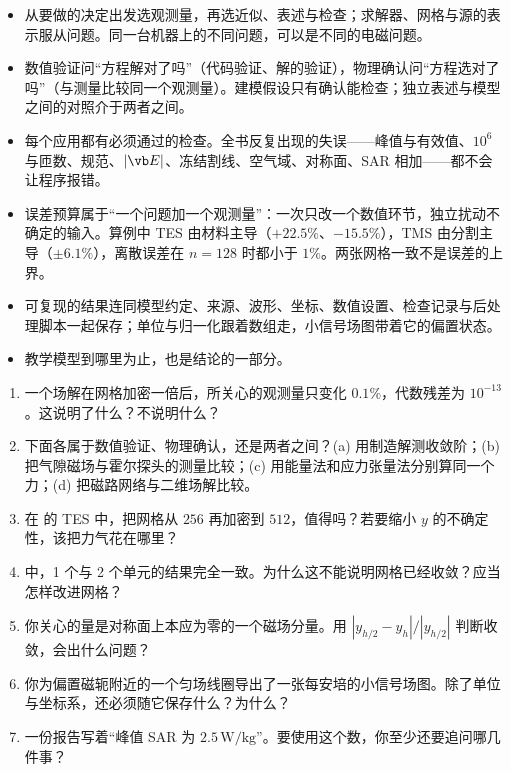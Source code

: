 \begin{takeaways}
\begin{itemize}
\item 从要做的决定出发选观测量，再选近似、表述与检查；求解器、网格与源的表示服从问题。同一台机器上的不同问题，可以是不同的电磁问题。
\item 数值验证问“方程解对了吗”（代码验证、解的验证），物理确认问“方程选对了吗”（与测量比较同一个观测量）。建模假设只有确认能检查；独立表述与模型之间的对照介于两者之间。
\item 每个应用都有必须通过的检查。全书反复出现的失误——峰值与有效值、$10^6$ 与匝数、规范、$|\vb E|$、冻结割线、空气域、对称面、SAR 相加——都不会让程序报错。
\item 误差预算属于“一个问题加一个观测量”：一次只改一个数值环节，独立扰动不确定的输入。算例中 TES 由材料主导（$+22.5\%$、$-15.5\%$），TMS 由分割主导（$\pm6.1\%$），离散误差在 $n=128$ 时都小于 $1\%$。两张网格一致不是误差的上界。
\item 可复现的结果连同模型约定、来源、波形、坐标、数值设置、检查记录与后处理脚本一起保存；单位与归一化跟着数组走，小信号场图带着它的偏置状态。
\item 教学模型到哪里为止，也是结论的一部分。
\end{itemize}
\end{takeaways}

\begin{selfcheck}
\begin{enumerate}
\item 一个场解在网格加密一倍后，所关心的观测量只变化 $0.1\%$，代数残差为 $10^{-13}$。这说明了什么？不说明什么？
\item 下面各属于数值验证、物理确认，还是两者之间？(a) 用制造解测收敛阶；(b) 把气隙磁场与霍尔探头的测量比较；(c) 用能量法和应力张量法分别算同一个力；(d) 把磁路网络与二维场解比较。
\item 在 的 TES 中，把网格从 $256$ 再加密到 $512$，值得吗？若要缩小 $y$ 的不确定性，该把力气花在哪里？
\item {} 中，1 个与 2 个单元的结果完全一致。为什么这不能说明网格已经收敛？应当怎样改进网格？
\item 你关心的量是对称面上本应为零的一个磁场分量。用 $|y_{h/2}-y_h|/|y_{h/2}|$ 判断收敛，会出什么问题？
\item 你为偏置磁轭附近的一个匀场线圈导出了一张每安培的小信号场图。除了单位与坐标系，还必须随它保存什么？为什么？
\item 一份报告写着“峰值 SAR 为 $2.5\,\mathrm{W/kg}$”。要使用这个数，你至少还要追问哪几件事？
\end{enumerate}
\end{selfcheck}

